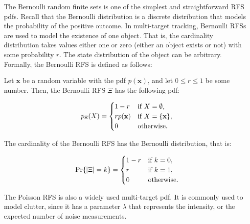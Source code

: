 The Bernoulli random finite sets is one of the simplest and straightforward RFS pdfs. Recall that the Bernoulli distribution is a discrete distribution that models the probability of the positive outcome. In multi-target tracking, Bernoulli RFSs are used to model the existence of one object. That is, the cardinality distribution takes values either one or zero (either an object exists or not) with some probability $r$. The state distribution of the object can be arbitrary. Formally, the Bernoulli RFS is defined as follows:

\begin{definition}
    Let $\mathbf{x}$ be a random variable with the pdf $p(\mathbf{x})$, and let $0 \leq r \leq 1$ be some number. Then, the Bernoulli RFS $\Xi$ has the following pdf:

    \begin{equation}
        p_\Xi(X) =
        \begin{cases}
            1 - r & \textup{if } X = \emptyset, \\
            r p(\mathbf{x}) & \textup{if } X = \{\mathbf{x}\}, \\
            0 & \textup{otherwise}.
        \end{cases}
    \end{equation}

    \noindent The cardinality of the Bernoulli RFS has the Bernoulli distribution, that is:

    \begin{equation}
        \Pr{|\Xi| = k} = \begin{cases}
            1 - r & \textup{if } k = 0, \\
            r & \textup{if } k = 1, \\
            0 & \textup{otherwise}.
        \end{cases}
    \end{equation}
\end{definition}

The Poisson RFS is also a widely used multi-target pdf. It is commonly used to model clutter, since it has a parameter $\lambda$ that represents the intensity, or the expected number of noise measurements.

